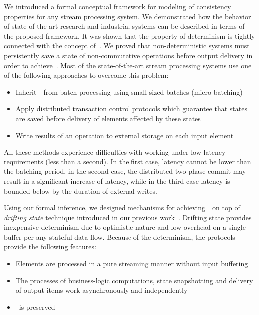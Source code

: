 
\label {fs-conclusion-seciton}

We introduced a formal conceptual framework for modeling of consistency properties for any stream processing system. We demonstrated how the behavior of state-of-the-art research and industrial systems can be described in terms of the proposed framework. It was shown that the property of determinism is tightly connected with the concept of~\eo. We proved that non-deterministic systems must persistently save a state of non-commutative operations before output delivery in order to achieve~\eo. Most of the state-of-the-art stream processing systems use one of the following approaches to overcome this problem: 

\begin{itemize}
    \item Inherit~\eo\ from batch processing using small-sized batches (micro-batching)
    \item Apply distributed transaction control protocols which guarantee that states are saved before delivery of elements affected by these states
    \item Write results of an operation to external storage on each input element
\end{itemize}

All these methods experience difficulties with working under low-latency requirements (less than a second). In the first case, latency cannot be lower than the batching period, in the second case, the distributed two-phase commit may result in a significant increase of latency, while in the third case latency is bounded below by the duration of external writes.

Using our formal inference, we designed mechanisms for achieving~\eo\ on top of {\em drifting state} technique introduced in our previous work~\cite{we2018adbis}. Drifting state provides inexpensive determinism due to optimistic nature and low overhead on a single buffer per any stateful data flow. Because of the determinism, the protocols provide the following features:

\begin{itemize}
    \item Elements are processed in a pure streaming manner without input buffering
    \item The processes of business-logic computations, state snapshotting and delivery of output items work asynchronously and independently
    \item \Eo\ is preserved
\end{itemize}

